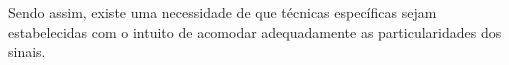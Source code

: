\begin{enumerate}
            Sendo assim, existe uma necessidade de que técnicas específicas sejam estabelecidas com o intuito de acomodar adequadamente as particularidades dos sinais.






\end{enumerate}
